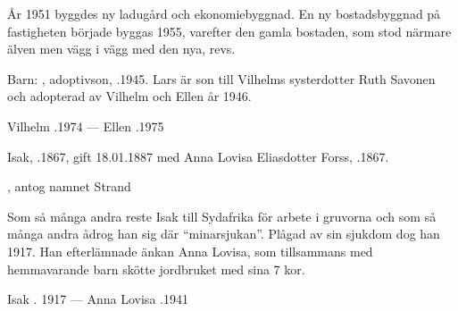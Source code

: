 År 1951 byggdes ny ladugård och ekonomiebyggnad. En ny bostadsbyggnad på fastigheten började byggas 1955, varefter den gamla bostaden, som stod närmare älven men vägg i vägg med den nya, revs.

Barn: , adoptivson, .1945. Lars är son till Vilhelms systerdotter Ruth Savonen och adopterad av Vilhelm och Ellen år 1946.

Vilhelm .1974  ---  Ellen .1975





Isak, .1867, gift 18.01.1887 med Anna Lovisa Eliasdotter Forss, .1867.
\begin{jhchildren}
  \item {}
  \item {}, antog namnet Strand
  \item {}
  \item {}
  \item {}
  \item {}
  \item {}
  \item {}
  \item {}
\end{jhchildren}

Som så många andra reste Isak till Sydafrika för arbete i gruvorna och som så många andra ådrog han sig där ``minarsjukan''. Plågad av sin sjukdom dog han 1917. Han efterlämnade änkan Anna Lovisa, som tillsammans med hemmavarande barn skötte jordbruket med sina 7 kor.

Isak . 1917  ---  Anna Lovisa .1941


